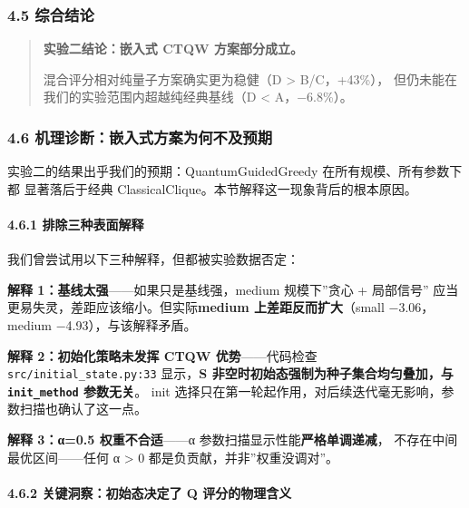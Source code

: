 \documentclass[
  11pt,
]{ctexart}
\begin{document}
\subsubsection{4.5 综合结论}\label{ux7efcux5408ux7ed3ux8bba}

\begin{quote}
\textbf{实验二结论：嵌入式 CTQW 方案部分成立。}

混合评分相对纯量子方案确实更为稳健（D \textgreater{} B/C，+43\%），
但仍未能在我们的实验范围内超越纯经典基线（D \textless{} A，−6.8\%）。
\end{quote}

\subsubsection{4.6
机理诊断：嵌入式方案为何不及预期}\label{ux673aux7406ux8bcaux65adux5d4cux5165ux5f0fux65b9ux6848ux4e3aux4f55ux4e0dux53caux9884ux671f}

实验二的结果出乎我们的预期：QuantumGuidedGreedy 在所有规模、所有参数下都
显著落后于经典 ClassicalClique。本节解释这一现象背后的根本原因。

\paragraph{4.6.1
排除三种表面解释}\label{ux6392ux9664ux4e09ux79cdux8868ux9762ux89e3ux91ca}

我们曾尝试用以下三种解释，但都被实验数据否定：

\textbf{解释 1：基线太强}------如果只是基线强，medium 规模下''贪心 +
局部信号'' 应当更易失灵，差距应该缩小。但实际\textbf{medium
上差距反而扩大}（small −3.06， medium −4.93），与该解释矛盾。

\textbf{解释 2：初始化策略未发挥 CTQW 优势}------代码检查
\texttt{src/initial\_state.py:33} 显示，\textbf{S
非空时初始态强制为种子集合均匀叠加，与 \texttt{init\_method} 参数无关}。
init 选择只在第一轮起作用，对后续迭代毫无影响，参数扫描也确认了这一点。

\textbf{解释 3：α=0.5 权重不合适}------α
参数扫描显示性能\textbf{严格单调递减}， 不存在中间最优区间------任何 α
\textgreater{} 0 都是负贡献，并非''权重没调对''。

\paragraph{4.6.2 关键洞察：初始态决定了 Q
评分的物理含义}\label{ux5173ux952eux6d1eux5bdfux521dux59cbux6001ux51b3ux5b9aux4e86-q-ux8bc4ux5206ux7684ux7269ux7406ux542bux4e49}
\end{document}
